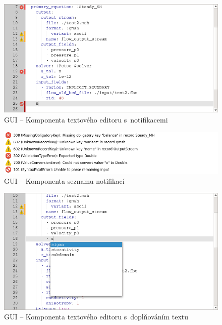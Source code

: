 \documentclass[FM,bw,DP]{tulthesis}
\begin{document}
\clearpage

\begin{figure}[ht]
	\centering
    \includegraphics[width=\textwidth]{../img/screenshots/gui_editor_notifications.png}
    \caption{GUI -- Komponenta textového editoru s~notifikacemi}
	\label{img:gui_editor_notifications}
\end{figure}

\begin{figure}[h]
	\centering
    \includegraphics[width=\textwidth]{../img/screenshots/gui_notifications.png}
    \caption{GUI -- Komponenta seznamu notifikací}
	\label{img:gui_notifications}
\end{figure}

\begin{figure}[H]
	\centering
    \includegraphics[width=\textwidth]{../img/screenshots/gui_editor_autocompletion.png}
    \caption{GUI -- Komponenta textového editoru s~doplňováním textu}
	\label{img:gui_editor_autocompletion}
\end{figure}
\end{document}

